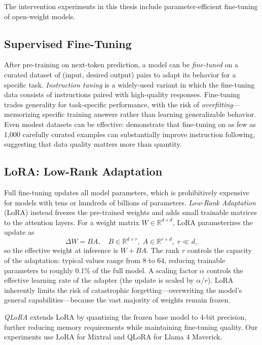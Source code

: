 The intervention experiments in this thesis include parameter-efficient fine-tuning of open-weight models.

\subsection{Supervised Fine-Tuning}
\label{sec:bg-sft}

After pre-training on next-token prediction, a model can be \emph{fine-tuned} on a curated dataset of (input, desired output) pairs to adapt its behavior for a specific task. \emph{Instruction tuning} \citep{ouyang2022training} is a widely-used variant in which the fine-tuning data consists of instructions paired with high-quality responses. Fine-tuning trades generality for task-specific performance, with the risk of \emph{overfitting}---memorizing specific training answers rather than learning generalizable behavior. Even modest datasets can be effective: \citet{zhou2023lima} demonstrate that fine-tuning on as few as 1,000 carefully curated examples can substantially improve instruction following, suggesting that data quality matters more than quantity.

\subsection{LoRA: Low-Rank Adaptation}
\label{sec:bg-lora}

Full fine-tuning updates all model parameters, which is prohibitively expensive for models with tens or hundreds of billions of parameters. \emph{Low-Rank Adaptation} (LoRA) \citep{hu2022lora} instead freezes the pre-trained weights and adds small trainable matrices to the attention layers. For a weight matrix $W \in \mathbb{R}^{d \times d}$, LoRA parameterizes the update as
\begin{equation}
\Delta W = B A, \quad B \in \mathbb{R}^{d \times r},\; A \in \mathbb{R}^{r \times d},\; r \ll d,
\label{eq:lora}
\end{equation}
so the effective weight at inference is $W + BA$. The rank $r$ controls the capacity of the adaptation: typical values range from 8 to 64, reducing trainable parameters to roughly 0.1\% of the full model. A scaling factor $\alpha$ controls the effective learning rate of the adapter (the update is scaled by $\alpha / r$). LoRA inherently limits the risk of catastrophic forgetting---overwriting the model's general capabilities---because the vast majority of weights remain frozen.

\emph{QLoRA} \citep{dettmers2023qlora} extends LoRA by quantizing the frozen base model to 4-bit precision, further reducing memory requirements while maintaining fine-tuning quality. Our experiments use LoRA for Mixtral and QLoRA for Llama 4 Maverick.

